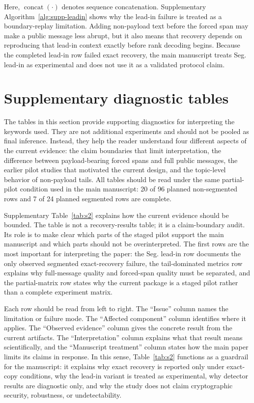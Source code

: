 \documentclass[fleqn,10pt]{wlscirep}
\begin{document}
Here, \(\operatorname{concat}(\cdot)\) denotes sequence concatenation. Supplementary Algorithm~\ref{alg:supp-leadin} shows why the lead-in failure is treated as a boundary-replay limitation. Adding non-payload text before the forced span may make a public message less abrupt, but it also means that recovery depends on reproducing that lead-in context exactly before rank decoding begins. Because the completed lead-in row failed exact recovery, the main manuscript treats Seg. lead-in as experimental and does not use it as a validated protocol claim.






\section*{Supplementary diagnostic tables}

The tables in this section provide supporting diagnostics for interpreting the keywords used. They are not additional experiments and should not be pooled as final inference. Instead, they help the reader understand four different aspects of the current evidence: the claim boundaries that limit interpretation, the difference between payload-bearing forced spans and full public messages, the earlier pilot studies that motivated the current design, and the topic-level behavior of non-payload tails. All tables should be read under the same partial-pilot condition used in the main manuscript: 20 of 96 planned non-segmented rows and 7 of 24 planned segmented rows are complete.

Supplementary Table~\ref{tab:s2} explains how the current evidence should be bounded. The table is not a recovery-results table; it is a claim-boundary audit. Its role is to make clear which parts of the staged pilot support the main manuscript and which parts should not be overinterpreted. The first rows are the most important for interpreting the paper: the Seg. lead-in row documents the only observed segmented exact-recovery failure, the tail-dominated metrics row explains why full-message quality and forced-span quality must be separated, and the partial-matrix row states why the current package is a staged pilot rather than a complete experiment matrix.

Each row should be read from left to right. The ``Issue'' column names the limitation or failure mode. The ``Affected component'' column identifies where it applies. The ``Observed evidence'' column gives the concrete result from the current artifacts. The ``Interpretation'' column explains what that result means scientifically, and the ``Manuscript treatment'' column states how the main paper limits its claims in response. In this sense, Table~\ref{tab:s2} functions as a guardrail for the manuscript: it explains why exact recovery is reported only under exact-copy conditions, why the lead-in variant is treated as experimental, why detector results are diagnostic only, and why the study does not claim cryptographic security, robustness, or undetectability.
\end{document}
